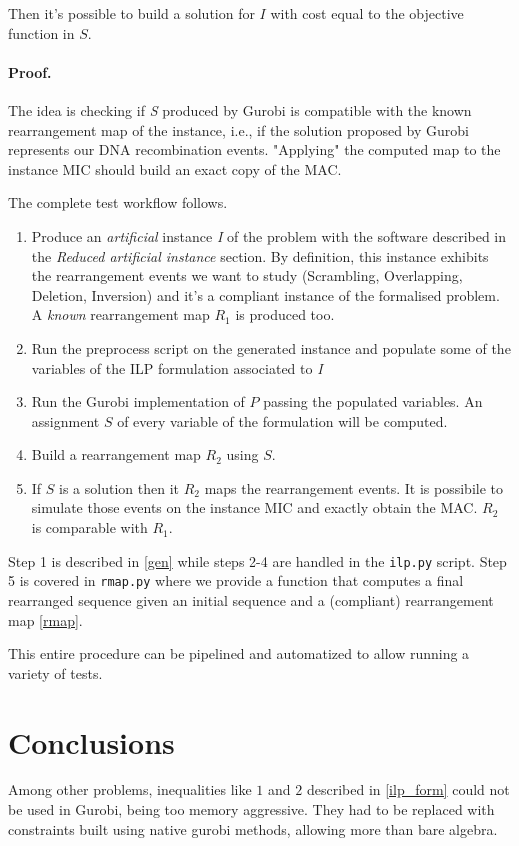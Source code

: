 Then it's possible to build a solution for $I$ with cost equal to the objective function in $S$.

\paragraph{Proof.}
The idea is checking if \textit{S} produced by Gurobi is compatible with the known rearrangement map of the instance, i.e., if the solution proposed by Gurobi represents our DNA recombination events. "Applying" the computed map to the instance MIC should build an exact copy of the MAC.

The complete test workflow follows.

\begin{enumerate}
	\item Produce an \textit{artificial} instance \textit{I} of the problem with the software described in the \textit{Reduced artificial instance} section. By definition, this instance exhibits the rearrangement events we want to study (Scrambling, Overlapping, Deletion, Inversion) and it's a compliant instance of the formalised problem. A \textit{known} rearrangement map $R_1$ is produced too.
	\item Run the preprocess script on the generated instance and populate some of the variables of the ILP formulation associated to \textit{I}
	\item Run the Gurobi implementation of $P$ passing the populated variables. An assignment $S$ of every variable of the formulation will be computed.
	\item Build a rearrangement map $R_2$ using $S$.
	\item If $S$ is a solution then it $R_2$ maps the rearrangement events. It is possibile to simulate those events on the instance MIC and exactly obtain the MAC. $R_2$ is comparable with $R_1$.
\end{enumerate}

Step 1 is described in \ref{gen} while steps 2-4 are handled in the \texttt{ilp.py} script. Step 5 is covered in \texttt{rmap.py} where we provide a function that computes a final rearranged sequence given an initial sequence and a (compliant) rearrangement map \ref{rmap}.

This entire procedure can be pipelined and automatized to allow running a variety of tests.

\section{Conclusions}
Among other problems, inequalities like $1$ and $2$ described in \ref{ilp_form} could not be used in Gurobi, being too memory aggressive. They had to be replaced with constraints built using native gurobi methods, allowing more than bare algebra.

